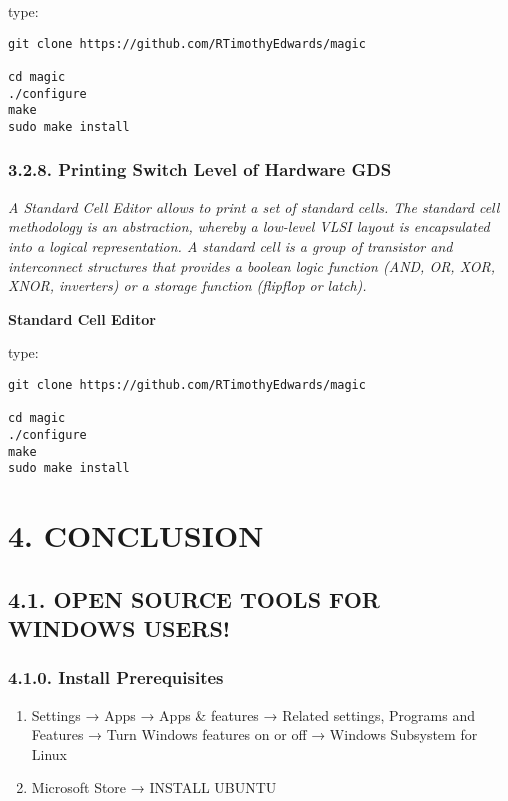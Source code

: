 \documentclass[]{article}
\begin{document}
type:

\begin{verbatim}
git clone https://github.com/RTimothyEdwards/magic

cd magic
./configure
make
sudo make install
\end{verbatim}

\subsubsection{3.2.8. Printing Switch Level of Hardware
GDS}\label{printing-switch-level-of-hardware-gds}

\emph{A Standard Cell Editor allows to print a set of standard cells.
The standard cell methodology is an abstraction, whereby a low-level
VLSI layout is encapsulated into a logical representation. A standard
cell is a group of transistor and interconnect structures that provides
a boolean logic function (AND, OR, XOR, XNOR, inverters) or a storage
function (flipflop or latch).}

\textbf{Standard Cell Editor}

type:

\begin{verbatim}
git clone https://github.com/RTimothyEdwards/magic

cd magic
./configure
make
sudo make install
\end{verbatim}

\section{4. CONCLUSION}\label{conclusion}

\subsection{4.1. OPEN SOURCE TOOLS FOR WINDOWS
USERS!}\label{open-source-tools-for-windows-users}

\subsubsection{4.1.0. Install
Prerequisites}\label{install-prerequisites}

\begin{enumerate}
\def\labelenumi{\arabic{enumi}.}
\item
  Settings → Apps → Apps \& features → Related settings, Programs and
  Features → Turn Windows features on or off → Windows Subsystem for
  Linux
\item
  Microsoft Store → INSTALL UBUNTU
\end{enumerate}
\end{document}
